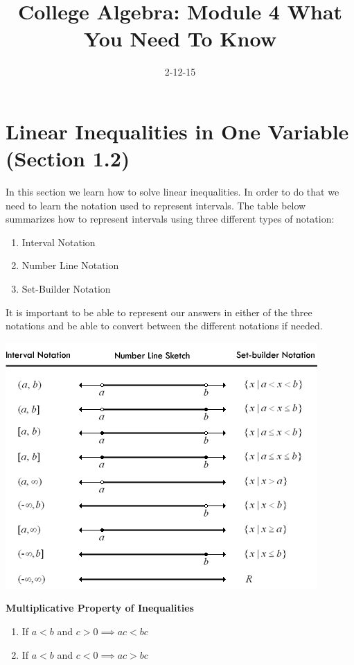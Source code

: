 \documentclass[12pt]{article}
\begin{document}
\title{College Algebra: Module 4 What You Need To Know}
\date{2-12-15}
\author{}
\maketitle


\section{Linear Inequalities in One Variable (Section 1.2)}

In this section we learn how to solve linear inequalities. In order to do that we need to learn the notation used to represent intervals. The table below summarizes how to represent intervals using three different types of notation:

\begin{enumerate}

\item Interval Notation
\item Number Line Notation
\item Set-Builder Notation

\end{enumerate}

It is important to be able to represent our answers in either of the three notations and be able to convert between the different notations if needed.

\centerline{\includegraphics[scale = 0.8]{SetInterval.png}}

\textbf{Multiplicative Property of Inequalities}

\begin{enumerate}

\item If $a < b$ and $c > 0 \implies ac < bc$ 
\item If $a < b$ and $c < 0 \implies ac > bc$

\end{enumerate}
\end{document}
